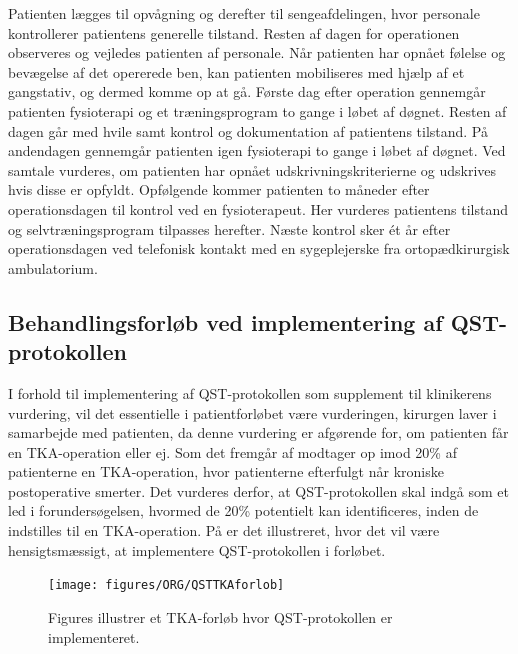 Patienten lægges til opvågning og derefter til sengeafdelingen, hvor personale kontrollerer patientens generelle tilstand. Resten af dagen for operationen observeres og vejledes patienten af personale. Når patienten har opnået følelse og bevægelse af det opererede ben, kan patienten mobiliseres med hjælp af et gangstativ, og dermed komme op at gå.  Første dag efter operation gennemgår patienten fysioterapi og et træningsprogram to gange i løbet af døgnet. Resten af dagen går med hvile samt kontrol og dokumentation af patientens tilstand. På andendagen gennemgår patienten igen fysioterapi to gange i løbet af døgnet. Ved samtale vurderes, om patienten har opnået udskrivningskriterierne og udskrives hvis disse er opfyldt. \citep{pritka2015}
Opfølgende kommer patienten to måneder efter operationsdagen til kontrol ved en fysioterapeut. Her vurderes patientens tilstand og selvtræningsprogram tilpasses herefter. Næste kontrol sker ét år efter operationsdagen ved telefonisk kontakt med en sygeplejerske fra ortopædkirurgisk ambulatorium. \citep{pritka2015}

\subsection{Behandlingsforløb ved implementering af QST-protokollen}
I forhold til implementering af QST-protokollen som supplement til klinikerens vurdering, vil det essentielle i patientforløbet være vurderingen, kirurgen laver i samarbejde med patienten, da denne vurdering er afgørende for, om patienten får en TKA-operation eller ej. Som det fremgår af  modtager op imod 20\% af patienterne en TKA-operation, hvor patienterne efterfulgt når kroniske postoperative smerter. Det vurderes derfor, at QST-protokollen skal indgå som et led i forundersøgelsen, hvormed de 20\% potentielt kan identificeres, inden de indstilles til en TKA-operation. På  er det illustreret, hvor det vil være hensigtsmæssigt, at implementere QST-protokollen i forløbet. 

\begin{figure}[H]
\begin{center}
	\texttt{[image: figures/ORG/QSTTKAforlob]}
\end{center}
	\caption{Figures illustrer et TKA-forløb hvor QST-protokollen er implementeret.}
	\label{fig:QSTKAforlob}
\end{figure}

